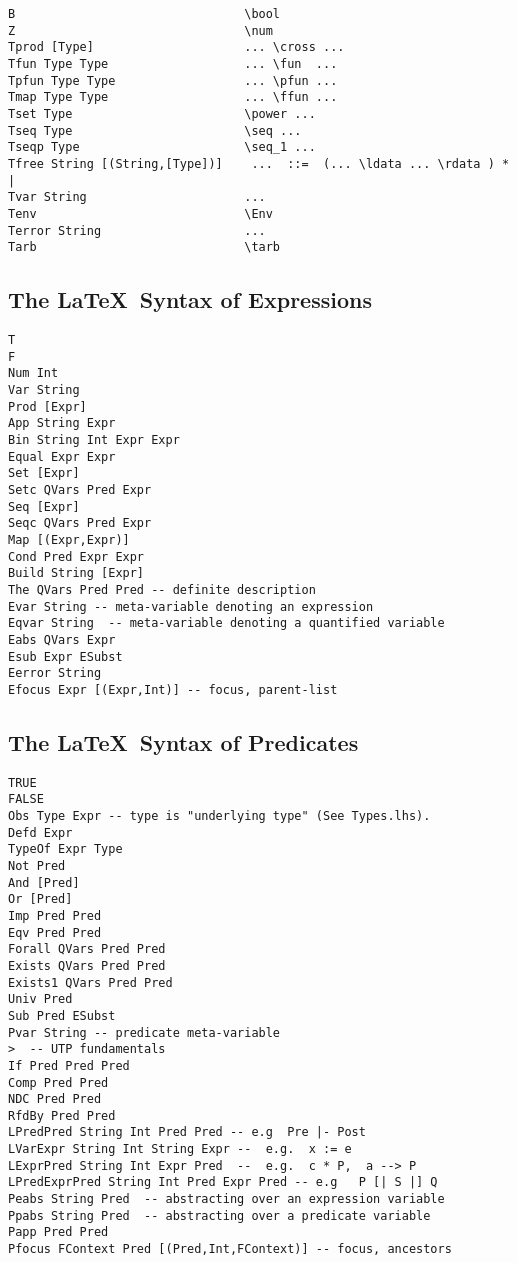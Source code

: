 \begin{verbatim}
B                                \bool
Z                                \num
Tprod [Type]                     ... \cross ...
Tfun Type Type                   ... \fun  ...
Tpfun Type Type                  ... \pfun ...
Tmap Type Type                   ... \ffun ...
Tset Type                        \power ...
Tseq Type                        \seq ...
Tseqp Type                       \seq_1 ...
Tfree String [(String,[Type])]    ...  ::=  (... \ldata ... \rdata ) * |
Tvar String                      ...
Tenv                             \Env
Terror String                    ...
Tarb                             \tarb
\end{verbatim}


\newpage
\subsection{The \LaTeX\ Syntax of Expressions}

\begin{verbatim}
T
F
Num Int
Var String
Prod [Expr]
App String Expr
Bin String Int Expr Expr
Equal Expr Expr
Set [Expr]
Setc QVars Pred Expr
Seq [Expr]
Seqc QVars Pred Expr
Map [(Expr,Expr)]
Cond Pred Expr Expr
Build String [Expr]
The QVars Pred Pred -- definite description
Evar String -- meta-variable denoting an expression
Eqvar String  -- meta-variable denoting a quantified variable
Eabs QVars Expr
Esub Expr ESubst
Eerror String
Efocus Expr [(Expr,Int)] -- focus, parent-list
\end{verbatim}


\newpage
\subsection{The \LaTeX\ Syntax of Predicates}

\begin{verbatim}
TRUE
FALSE
Obs Type Expr -- type is "underlying type" (See Types.lhs).
Defd Expr
TypeOf Expr Type
Not Pred
And [Pred]
Or [Pred]
Imp Pred Pred
Eqv Pred Pred
Forall QVars Pred Pred
Exists QVars Pred Pred
Exists1 QVars Pred Pred
Univ Pred
Sub Pred ESubst
Pvar String -- predicate meta-variable
>  -- UTP fundamentals
If Pred Pred Pred
Comp Pred Pred
NDC Pred Pred
RfdBy Pred Pred
LPredPred String Int Pred Pred -- e.g  Pre |- Post
LVarExpr String Int String Expr --  e.g.  x := e
LExprPred String Int Expr Pred  --  e.g.  c * P,  a --> P
LPredExprPred String Int Pred Expr Pred -- e.g   P [| S |] Q
Peabs String Pred  -- abstracting over an expression variable
Ppabs String Pred  -- abstracting over a predicate variable
Papp Pred Pred
Pfocus FContext Pred [(Pred,Int,FContext)] -- focus, ancestors
\end{verbatim}



